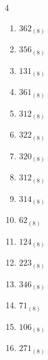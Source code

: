 \begin{multicols}{4}
\begin{enumerate}
  \item $362_{(8)}$

        \phantom{$=242$}

  \item $356_{(8)}$

        \phantom{$=238$}

  \item $131_{(8)}$

        \phantom{$=89$}

  \item $361_{(8)}$

        \phantom{$=241$}

  \item $312_{(8)}$

        \phantom{$=202$}

  \item $322_{(8)}$

        \phantom{$=210$}

  \item $320_{(8)}$

        \phantom{$=208$}

  \item $312_{(8)}$

        \phantom{$=202$}

  \item $314_{(8)}$

        \phantom{$=204$}

\columnbreak %

  \item $62_{(8)}$

        \phantom{$=50$}

  \item $124_{(8)}$

        \phantom{$=84$}

  \item $223_{(8)}$

        \phantom{$=147$}

  \item $346_{(8)}$

        \phantom{$=230$}

  \item $71_{(8)}$

        \phantom{$=57$}

  \item $106_{(8)}$

        \phantom{$=70$}

  \item $271_{(8)}$


\end{enumerate}
\end{multicols}
